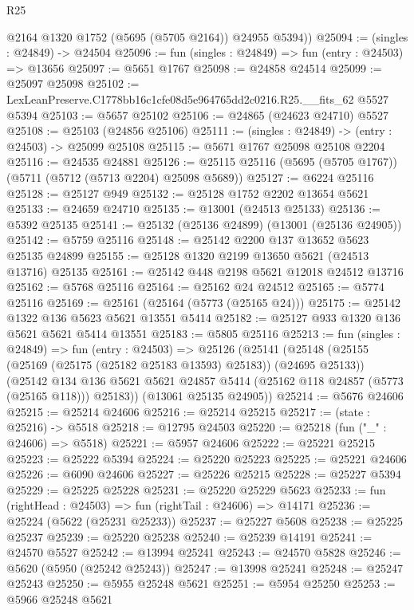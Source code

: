 \begin{lexlean}{R25}
\begin{coremodule}
        @2164
        @1320
        @1752
        (@5695 (@5705 @2164))
        @24955
        @5394))
@25094 := (singles : @24849) -> @24504
@25096 := fun (singles : @24849) => fun (entry : @24503) => @13656
@25097 := @5651 @1767
@25098 := @24858 @24514
@25099 := @25097 @25098
@25102 := LexLeanPreserve.C1778bb16c1cfe08d5e964765dd2c0216.R25.__fits_62 @5527 @5394
@25103 := @5657 @25102
@25106 := @24865 (@24623 @24710) @5527
@25108 := @25103 (@24856 @25106)
@25111 := (singles : @24849) -> (entry : @24503) -> @25099 @25108
@25115 := @5671 @1767 @25098 @25108 @2204
@25116 := @24535 @24881
@25126 := @25115 @25116 (@5695 (@5705 @1767)) (@5711 (@5712 (@5713 @2204) @25098 @5689))
@25127 := @6224 @25116
@25128 := @25127 @949
@25132 := @25128 @1752 @2202 @13654 @5621
@25133 := @24659 @24710
@25135 := @13001 (@24513 @25133)
@25136 := @5392 @25135
@25141 := @25132 (@25136 @24899) (@13001 (@25136 @24905))
@25142 := @5759 @25116
@25148 := @25142 @2200 @137 @13652 @5623 @25135 @24899
@25155 := @25128 @1320 @2199 @13650 @5621 (@24513 @13716) @25135
@25161 := @25142 @448 @2198 @5621 @12018 @24512 @13716
@25162 := @5768 @25116
@25164 := @25162 @24 @24512
@25165 := @5774 @25116
@25169 := @25161 (@25164 (@5773 (@25165 @24)))
@25175 := @25142 @1322 @136 @5623 @5621 @13551 @5414
@25182 := @25127 @933 @1320 @136 @5621 @5621 @5414 @13551
@25183 := @5805 @25116
@25213 := fun (singles : @24849) =>
  fun (entry : @24503) =>
  @25126
    (@25141
      (@25148
        (@25155 (@25169 (@25175 (@25182 @25183 @13593) @25183)) (@24695 @25133))
        (@25142
          @134
          @136
          @5621
          @5621
          @24857
          @5414
          (@25162 @118 @24857 (@5773 (@25165 @118)))
          @25183))
      (@13061 @25135 @24905))
@25214 := @5676 @24606
@25215 := @25214 @24606
@25216 := @25214 @25215
@25217 := (state : @25216) -> @5518
@25218 := @12795 @24503
@25220 := @25218 (fun ("_" : @24606) => @5518)
@25221 := @5957 @24606
@25222 := @25221 @25215
@25223 := @25222 @5394
@25224 := @25220 @25223
@25225 := @25221 @24606
@25226 := @6090 @24606
@25227 := @25226 @25215
@25228 := @25227 @5394
@25229 := @25225 @25228
@25231 := @25220 @25229 @5623
@25233 := fun (rightHead : @24503) => fun (rightTail : @24606) => @14171
@25236 := @25224 (@5622 (@25231 @25233))
@25237 := @25227 @5608
@25238 := @25225 @25237
@25239 := @25220 @25238
@25240 := @25239 @14191
@25241 := @24570 @5527
@25242 := @13994 @25241
@25243 := @24570 @5828
@25246 := @5620 (@5950 (@25242 @25243))
@25247 := @13998 @25241
@25248 := @25247 @25243
@25250 := @5955 @25248 @5621
@25251 := @5954 @25250
@25253 := @5966 @25248 @5621

\end{coremodule}
\end{lexlean}
